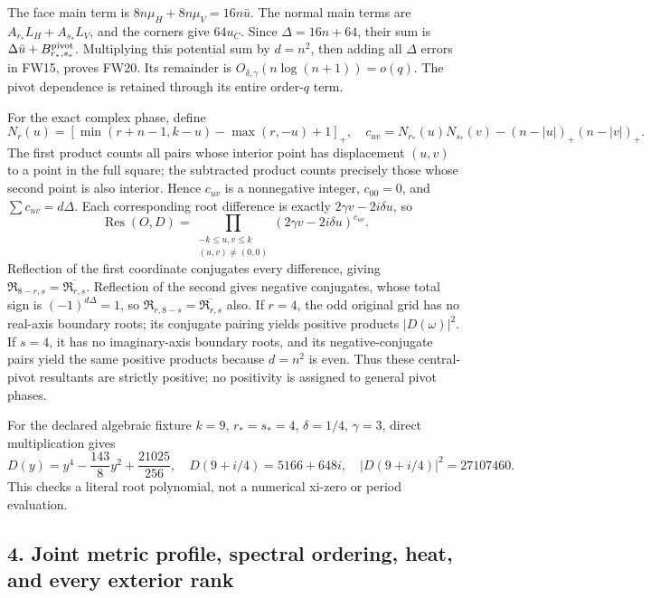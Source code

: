 \documentclass[11pt]{article}
\begin{document}
The face main term is \(8n\mu_H+8n\mu_V=16n\bar u\). The normal main terms are \(A_{r_*}L_H+A_{s_*}L_V\), and the corners give \(64u_C\). Since \(\Delta=16n+64\), their sum is \(\Delta\bar u+B_{r_*,s_*}^{\rm pivot}\). Multiplying this potential sum by \(d=n^2\), then adding all \(\Delta\) errors in FW15, proves FW20. Its remainder is \(O_{\delta,\gamma}(n\log(n+1))=o(q)\). The pivot dependence is retained through its entire order-\(q\) term.

For the exact complex phase, define \[
N_r(u)=[\min(r+n-1,k-u)-\max(r,-u)+1]_+,
\quad c_{uv}=N_{r_*}(u)N_{s_*}(v)-(n-|u|)_+(n-|v|)_+.
\] The first product counts all pairs whose interior point has displacement \((u,v)\) to a point in the full square; the subtracted product counts precisely those whose second point is also interior. Hence \(c_{uv}\) is a nonnegative integer, \(c_{00}=0\), and \(\sum c_{uv}=d\Delta\). Each corresponding root difference is exactly \(2\gamma v-2i\delta u\), so \[
\operatorname{Res}(O,D)=\prod_{\substack{-k\le u,v\le k\\(u,v)\ne(0,0)}}
(2\gamma v-2i\delta u)^{c_{uv}}.
\tag{FW21}
\] Reflection of the first coordinate conjugates every difference, giving \(\mathfrak R_{8-r,s}=\overline{\mathfrak R_{r,s}}\). Reflection of the second gives negative conjugates, whose total sign is \((-1)^{d\Delta}=1\), so \(\mathfrak R_{r,8-s}=\overline{\mathfrak R_{r,s}}\) also. If \(r=4\), the odd original grid has no real-axis boundary roots; its conjugate pairing yields positive products \(|D(\omega)|^2\). If \(s=4\), it has no imaginary-axis boundary roots, and its negative-conjugate pairs yield the same positive products because \(d=n^2\) is even. Thus these central-pivot resultants are strictly positive; no positivity is assigned to general pivot phases.

For the declared algebraic fixture \(k=9\), \(r_*=s_*=4\), \(\delta=1/4\), \(\gamma=3\), direct multiplication gives \[
D(y)=y^4-\frac{143}{8}y^2+\frac{21025}{256},\quad
D(9+i/4)=5166+648i,\quad |D(9+i/4)|^2=27107460.
\tag{FW22}
\] This checks a literal root polynomial, not a numerical xi-zero or period evaluation.

\subsection{4. Joint metric profile, spectral ordering, heat, and every exterior rank}\label{joint-metric-profile-spectral-ordering-heat-and-every-exterior-rank}
\end{document}
